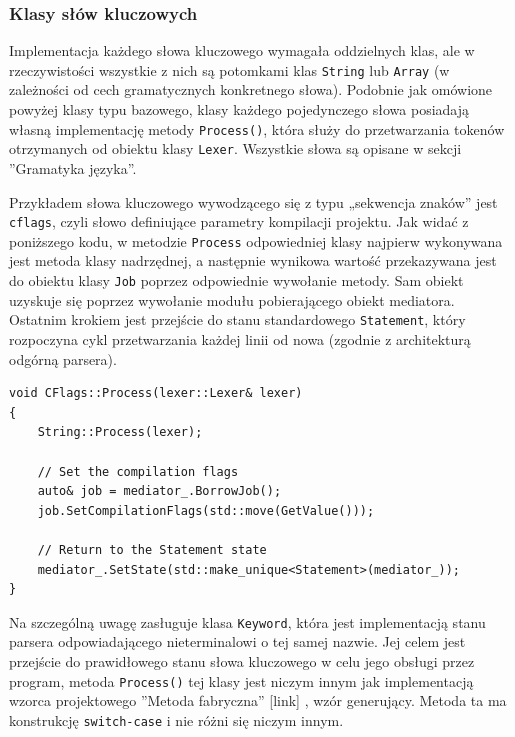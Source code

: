 \subsubsection{Klasy słów kluczowych}

Implementacja każdego słowa kluczowego wymagała oddzielnych klas, ale w rzeczywistości wszystkie z nich są potomkami klas \texttt{String} lub \texttt{Array} (w zależności od cech gramatycznych konkretnego słowa). Podobnie jak omówione powyżej klasy typu bazowego, klasy każdego pojedynczego słowa posiadają własną implementację metody \texttt{Process()}, która służy do przetwarzania tokenów otrzymanych od obiektu klasy \texttt{Lexer}. Wszystkie słowa są opisane w sekcji ''Gramatyka języka''.

Przykładem słowa kluczowego wywodzącego się z typu „sekwencja znaków” jest \texttt{cflags}, czyli słowo definiujące parametry kompilacji projektu. Jak widać z poniższego kodu, w metodzie \texttt{Process} odpowiedniej klasy najpierw wykonywana jest metoda klasy nadrzędnej, a następnie wynikowa wartość przekazywana jest do obiektu klasy \texttt{Job} poprzez odpowiednie wywołanie metody. Sam obiekt uzyskuje się poprzez wywołanie modułu pobierającego obiekt mediatora. Ostatnim krokiem jest przejście do stanu standardowego \texttt{Statement}, który rozpoczyna cykl przetwarzania każdej linii od nowa (zgodnie z architekturą odgórną parsera).

\begin{lstlisting}[label=list:cflags,caption=Metoda CFlags::Process(),basicstyle=\footnotesize\ttfamily]
void CFlags::Process(lexer::Lexer& lexer)
{
    String::Process(lexer);

    // Set the compilation flags
    auto& job = mediator_.BorrowJob();
    job.SetCompilationFlags(std::move(GetValue()));

    // Return to the Statement state
    mediator_.SetState(std::make_unique<Statement>(mediator_));
}
\end{lstlisting}
    
Na szczególną uwagę zasługuje klasa \texttt{Keyword}, która jest implementacją stanu parsera odpowiadającego nieterminalowi o tej samej nazwie. Jej celem jest przejście do prawidłowego stanu słowa kluczowego w celu jego obsługi przez program, metoda \texttt{Process()} tej klasy jest niczym innym jak implementacją wzorca projektowego ''Metoda fabryczna'' [link] , wzór generujący. Metoda ta ma konstrukcję \texttt{switch-case} i nie różni się niczym innym.

